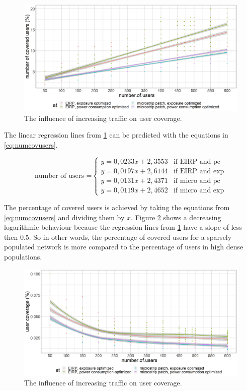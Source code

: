 \begin{figure}[h!]
  \includegraphics[width=\textwidth]{../results/s2/uvsnumcovusers.png}
  \caption{The influence of increasing traffic on user coverage.}
  \label{fig:s2uvsnumcovusers}
\end{figure}

The linear regression lines from \ref{fig:s2uvsnumcovusers} can be predicted with the equations in \ref{eq:numcovusers}.

\begin{equation}
\text{number of users =}
    \begin{cases}
      y = 0,0233x + 2,3553 & \text{if EIRP and pc}\\
      y = 0,0197x + 2,6144  & \text{if EIRP and exp}\\
      y = 0,0131x + 2,4371  & \text{if micro and pc}\\
      y = 0,0119x + 2,4652  & \text{if micro and exp}
    \end{cases} 
    \label{eq:numcovusers}      
\end{equation}

The percentage of covered users is achieved by taking the equations from \ref{eq:numcovusers} and dividing them by $x$.
Figure \ref{fig:s2uvscov} shows a decreasing logarithmic behaviour because the regression lines from  \ref{fig:s2uvsnumcovusers} have a slope of less then 0.5.
So in other words, the  percentage of covered users for a sparsely populated network is more compared to the percentage of users in high dense populations.

\begin{figure}[h!]
  \includegraphics[width=\textwidth]{../results/s2/uvscov.png}
  \caption{The influence of increasing traffic on user coverage.}
  \label{fig:s2uvscov}
\end{figure}

